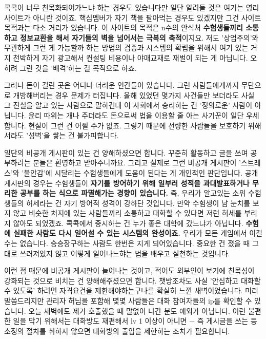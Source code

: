 콕콕이 너무 친목화되어가느냐 하는 경우도 있습니다만 일단 알려둘 것은
여기는 영리 사이트가 아니란 것이죠. 핵심멤버가 자기 책을 팔아먹는 경우도 있겠지만 그건 사이트 목적과는 다소 거리가 있습니다.
이 사이트의 목적은 n수의 안식처 \textbf{수험생들끼리 소통하고 정보교환을 해서 자기들의 벽을 넘어서는 극복의 축적}이지요.
저도 '상업주의'와 무관하게 그런 게 가능할까 하는 방법의 검증과 시스템의 확립을 위해서 여기 있는 거지
천박하게 자기 광고해서 컨설팅 비용이나 야매교재로 재벌이 되는 게 아닙니다. 오히려 그런 것을 '배격'하는 걸 목적으로 하죠.
\vspace{5mm}

그러나 돈이 걸린 곳은 어디나 더러운 인간들이 있습니다.
그런 사람들에게까지 무단으로 개방해버리는 경우 문제가 터집니다.
올해 있었던 몇가지 사건들만 보더라도 사실 그 진실을 알고 있는 사람으로 말하건대 이 사회에서 승리하는 건 '정의로운' 사람이 아닙니다.
윤리 따위는 개나 주더라도 돈으로써 법을 이용할 줄 아는 사기꾼이 일단 우세합니다. 현실이 그런 건 어쩔 수가 없죠.
그렇기 때문에 선량한 사람들을 보호하기 위해서라도 '성벽'을 쌓는 건 불가피합니다.
\vspace{5mm}

일단의 비공개 게시판이 있는 건 양해하셨으면 합니다. 꾸준히 활동하고 글을 쓰며 공부하려는 분들은 환영하고 받아주니까요.
그리고 실제로 그런 비공개 게시판이 '스트레스'와 '불안감'에 시달리는 수험생들에게 도움이 된다는 게 개인적인 판단입니다.
공개 게시판의 경우는 수험생들이 \textbf{자기를 방어하기 위해 일부러 성적을 과대발표하거나 무리한 공부를 하는 식으로 파멸해가는 경향이 있습니다.}
즉, 우리가 알고있는 소위 수험생들의 허세라는 건 자기 방어적 성격이 강하단 것입니다.
만약 수험생이 남 눈치를 보지 않고 비슷한 처지에 있는 사람들끼리 소통하고 대화할 수 있다면 저런 허세를 부리지 않아도 되었겠죠.
콕콕에서 중시하는 건 누가 좋은 대학에 갔느냐가 아닙니다.
\textbf{수험에 실패한 사람도 다시 일어설 수 있는 시스템의 완성이죠.}
우리가 모든 게임에서 이길 수는 없습니다. 승승장구하는 사람도 한번은 지게 되어있습니다.
중요한 건 졌을 때 그대로 쓰러져있지 않고 어떻게 일어나느햐는 법을 배우고 실천하는 것입니다.
\vspace{5mm}

이런 점 때문에 비공개 게시판이 늘어나는 것이고, 적어도 외부인이 보기에 친목성이 강화되는 것으로 비치는 건 양해해주셨으면 합니다.
챗방조차도 사실 '안심하고 대화할 수 있도록' 하려면 자격요건을 제한해야하는구나를 확실히 느낀 새벽이었습니다.
미리 말씀드리지만 관리자 허님을 포함해 몇몇 사람들은 대화 참여자들의 ip를 확인할 수 있습니다.
오늘 새벽에도 제가 호출했을 때 말없이 나간 분도 예외가 아닙니다.
이런 불편한 일을 막기 위해서는 대화방도 재편해서 lv 1 이상이 아니면 $-$ 즉 게시글을 쓰는 등 소정의 절차를 취하지 않으면
대화방의 출입을 제한하는 조치가 필요합니다.
\vspace{5mm}

